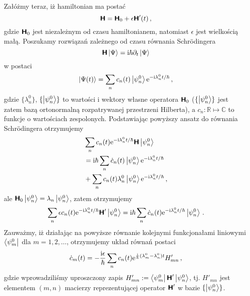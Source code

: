 \documentclass{myclass}
\begin{document}
Załóżmy teraz, iż hamiltonian ma postać
\begin{equation*}
    \boldsymbol{\mathsf{H}} = \boldsymbol{\mathsf{H}}_0 + \epsilon\boldsymbol{\mathsf{H}}'(t)\,,
\end{equation*}
gdzie \(\boldsymbol{\mathsf{H}}_0\) jest niezależnym od czasu hamiltonianem, natomiast \(\epsilon\) jest wielkością
małą. Poszukamy rozwiązań zależnego od czasu równania Schr\"{o}dingera
\begin{equation*}
    \boldsymbol{\mathsf{H}}\ket{\Psi} = \mathrm{i}\hbar\partial_t\ket{\Psi}
\end{equation*}
w postaci
\begin{equation*}
    \ket{\Psi(t)} = \sum_n c_n(t)\ket{\psi^0_n}\mathrm{e}^{-\mathrm{i}\lambda^0_nt/\hbar}\,,
\end{equation*}
gdzie \(\{\lambda^0_n\}\), \(\{\ket{\psi^0_n}\}\) to wartości i wektory własne operatora
\(\boldsymbol{\mathsf{H}}_0\) (\(\{\ket{\psi^0_n}\}\) jest zatem bazą ortonormalną rozpatrywanej przestrzeni
Hilberta), a \(c_n:\mathbb{R}\mapsto\mathbb{C}\) to funkcje o wartościach zespolonych. Podstawiając
powyższy ansatz do równania Schr\"{o}dingera otrzymujemy
\begin{equation*}
    \begin{split}
        &\sum_nc_n(t)\mathrm{e}^{-\mathrm{i}\lambda^0_nt/\hbar}\boldsymbol{\mathsf{H}}\ket{\psi^0_n} \\
        &= \mathrm{i}\hbar\sum_n\dot{c}_n(t)\ket{\psi^0_n}\mathrm{e}^{-\mathrm{i}\lambda^0_nt/\hbar}\\
        &+ \sum_nc_n(t)\lambda_n^0\ket{\psi^0_n}\mathrm{e}^{-\mathrm{i}\lambda^0_nt/\hbar}\,,
    \end{split}
\end{equation*}
ale \(\boldsymbol{\mathsf{H}}_0\ket{\psi_n^0} = \lambda_n\ket{\psi_n^0}\), zatem otrzymujemy
\begin{equation*}
    \sum_n \epsilon c_n(t)\mathrm{e}^{-\mathrm{i}\lambda_n^0t/\hbar}\boldsymbol{\mathsf{H}}'\ket{\psi_n^0} = \mathrm{i}\hbar\sum_n\dot{c}_n(t)\mathrm{e}^{-\mathrm{i}\lambda_n^0t/\hbar}\ket{\psi_n^0}\,.
\end{equation*}
Zauważmy, iż działając na powyższe równanie kolejnymi funkcjonałami liniowymi \(\bra{\psi_m^0}\) dla
\(m=1,2,\ldots\), otrzymujemy układ równań postaci
\begin{equation*}
    \dot{c}_m(t) = - \frac{\mathrm{i}\epsilon}{\hbar} \sum_n c_n(t)\mathrm{e}^{\frac{\mathrm{i}}{\hbar}(\lambda_m^0-\lambda_n^0)t} H'_{mn}\,,
\end{equation*}
gdzie wprowadziliśmy uproszczony zapis \(H'_{mn} := \bra{\psi_m^0}\boldsymbol{\mathsf{H}}'\ket{\psi_n^0}\), tj.
\(H'_{mn}\) jest elementem \((m,n)\) macierzy reprezentującej operator \(\boldsymbol{\mathsf{H}}'\) w bazie
\(\{\ket{\psi_n^0}\}\).
\end{document}
